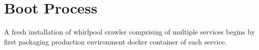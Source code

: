 \section{Boot Process}
% 
% 
% 
% 

A fresh installation of whirlpool crawler comprising of multiple services begins by first packaging
production environment docker container of each service.


\pagebreak